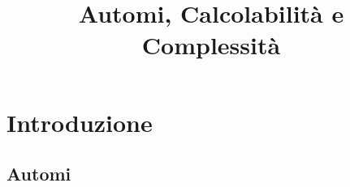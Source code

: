 



\title{Automi, Calcolabilit\`a e Complessit\`a}

\maketitle

\newpage

\tableofcontents
\newpage

\part{Introduzione}

\chapter{Automi}



\listoftables

\listoffigures


